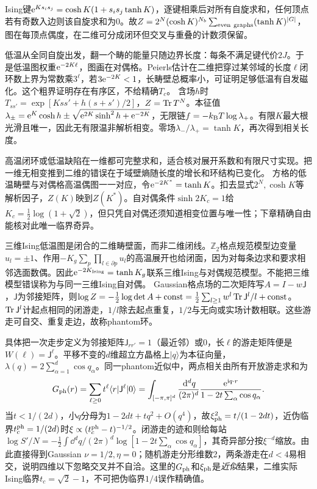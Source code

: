 \label{ch:duality}
Ising键$\mathrm e^{Ks_is_j}=\cosh K(1+s_is_j\tanh K)$，逐键相乘后对所有自旋求和，任何顶点若有奇数入边则该自旋求和为0。故$Z=2^N(\cosh K)^{N_b}\sum_{\rm even\ graphs}(\tanh K)^{|G|}$，图在每顶点偶度，在二维可分成闭环但交叉与重叠的计数须保留。

低温从全同自旋出发，翻一个畴的能量只随边界长度：每条不满足键代价$2J$。于是低温图权重$\mathrm e^{-2K\ell}$，图画在对偶格。Peierls估计在二维把穿过某邻域的长度$\ell$闭环数上界为常数乘$3^\ell$，若$3\mathrm e^{-2K}<1$，长畴壁总概率小，可证明足够低温有自发磁化。这个粗界证明存在有序区，不给精确$T_c$。
含场$h$时$T_{ss'}=\exp[Kss'+h(s+s')/2]$，$Z=\operatorname{Tr} T^N$。本征值$\lambda_\pm=\mathrm e^K\cosh h\pm\sqrt{\mathrm e^{2K}\sinh^2h+\mathrm e^{-2K}}$，无限链$f=-k_{\mathrm B} T\log\lambda_+$。有限$K$最大根光滑且唯一，因此无有限温非解析相变。零场$\lambda_-/\lambda_+=\tanh K$，再次得到相关长度。

高温闭环或低温缺陷在一维都可完整求和，适合核对展开系数和有限尺寸实现。把一维无相变推到二维的错误在于域壁熵随长度的增长和环结构已变化。
方格的低温畴壁与对偶格高温偶图一一对应，令$\mathrm e^{-2K^*}=\tanh K$。扣去显式$2^N,\cosh K$等解析因子，$Z(K)$映到$Z(K^*)$。自对偶条件$\sinh2K_c=1$给$K_c=\frac12\log(1+\sqrt2)$，但只凭自对偶还须知道相变位置与唯一性；下章精确自由能核对此唯一临界奇异。

三维Ising低温图是闭合的二维畴壁面，而非二维闭线。$\mathbb Z_2$格点规范模型边变量$u_l=\pm1$、作用$-K_g\sum_p\prod_{l\in\partial p}u_l$的高温展开也给闭面，因为对每条边求和要求相邻选面数偶。因此$\mathrm e^{-2K_{\mathrm{Ising}}}=\tanh K_g$联系三维Ising与对偶规范模型。不能把三维模型错误称为与同一三维Ising自对偶。
Gaussian格点场的二次矩阵写$A=I-w\mathsf J$，$\mathsf J$为邻接矩阵，则$\log Z=-\frac12\log\det A+\mathrm{const}=\frac12\sum_{l\ge1}w^l\operatorname{Tr}\mathsf J^l/l+\mathrm{const}$。$\operatorname{Tr}\mathsf J^l$计起点相同的闭游走，$1/l$除去起点重复，$1/2$与无向或实场计数相联。这些游走可自交、重复走边，故称phantom环。

具体把一次走步定义为邻接矩阵$\mathsf J_{rr'}=1$（最近邻）或0，长$\ell$的游走矩阵便是$W(\ell)=\mathsf J^\ell$。平移不变的$d$维超立方晶格上$|q\rangle$为本征向量，$\lambda(q)=2\sum_{\alpha=1}^d\cos q_\alpha$。同一phantom近似中，两点相关由所有开放游走求和为
\begin{equation}
G_{\rm ph}(r)=\sum_{\ell\ge0}t^\ell\langle r|\mathsf J^\ell|0\rangle
=\int_{[-\pi,\pi]^d}\frac{\,\mathrm d^dq}{(2\pi)^d}
\frac{\mathrm e^{\mathrm i q\cdot r}}{1-2t\sum_\alpha\cos q_\alpha}.
\end{equation}
当$t<1/(2d)$，小$q$分母为$1-2dt+tq^2+O(q^4)$，故$\xi_{\rm ph}^2=t/(1-2dt)$，近伪临界$t_c^{\rm ph}=1/(2d)$时$\xi\propto(t_c^{\rm ph}-t)^{-1/2}$。闭游走的迹和则给每站$\log S' /N=-\frac12\int\dd^dq/(2\pi)^d\log[1-2t\sum_\alpha\cos q_\alpha]$，其奇异部分按$\xi^{-d}$缩放。由此直接得到Gaussian $\nu=1/2,\eta=0$；随机游走分形维数2，两条游走在$d<4$易相交，说明四维以下忽略交叉并不自洽。这里的$G_{\rm ph}$和$\xi_{\rm ph}$是\emph{近似}结果，二维实际Ising临界$t_c=\sqrt2-1$，不可把伪临界$1/4$误作精确值。

